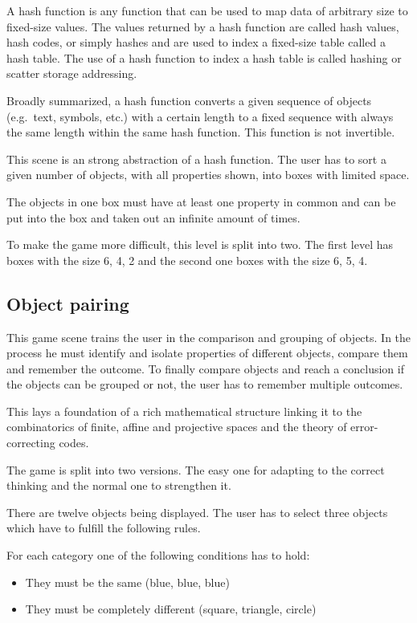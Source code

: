 A hash function is any function that can be used to map data of arbitrary size to fixed-size values.
The values returned by a hash function are called hash values, hash codes, or simply hashes and
are used to index a fixed-size table called a hash table.
The use of a hash function to index a hash table is called hashing or scatter storage addressing.\cite{artofcomputerscience}

Broadly summarized, a hash function converts a given sequence of objects (e.g.\ text, symbols, etc.)
with a certain length to a fixed sequence with always the same length within the same hash function.
This function is not invertible.

This scene is an strong abstraction of a hash function.
The user has to sort a given number of objects, with all properties shown, into boxes with limited space.

The objects in one box must have at least one property in common and
can be put into the box and taken out an infinite amount of times.

To make the game more difficult, this level is split into two.
The first level has boxes with the size 6, 4, 2 and the second one boxes with the size 6, 5, 4.

\subsection{Object pairing}\label{subsec:object-pairing}
This game scene trains the user in the comparison and grouping of objects.
In the process he must identify and isolate properties of different objects, compare them and remember the outcome.
To finally compare objects and reach a conclusion if the objects can be grouped or not,
the user has to remember multiple outcomes.

This lays a foundation of a rich mathematical structure linking it to the combinatorics of finite, affine and
projective spaces and the theory of error-correcting codes.\cite{cardgameset}

The game is split into two versions. The easy one for adapting to the correct thinking
and the normal one to strengthen it.

There are twelve objects being displayed.
The user has to select three objects which have to fulfill the following rules.

For each category one of the following conditions has to hold:
\begin{itemize}
    \item They must be the same (blue, blue, blue)
    \item They must be completely different (square, triangle, circle)
\end{itemize}

